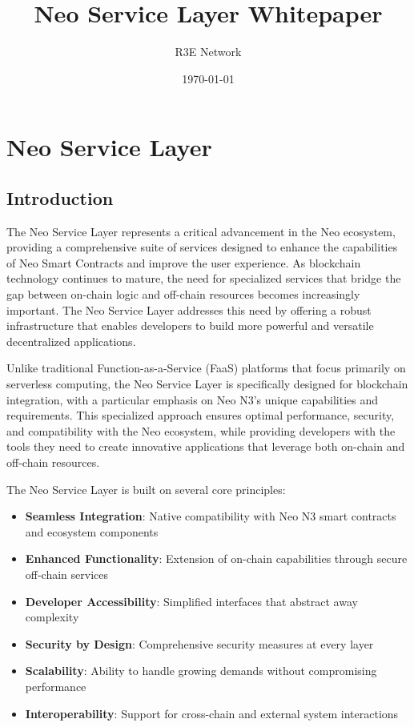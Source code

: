 \documentclass{article}
\title{Neo Service Layer Whitepaper}
\author{R3E Network}
\date{\today}
\begin{document}
\maketitle
\tableofcontents
\newpage

\section{Neo Service Layer}
\label{sec:neo-service-layer}

\subsection{Introduction}
\label{subsec:nsl-intro}

The Neo Service Layer represents a critical advancement in the Neo ecosystem, providing a comprehensive suite of services designed to enhance the capabilities of Neo Smart Contracts and improve the user experience. As blockchain technology continues to mature, the need for specialized services that bridge the gap between on-chain logic and off-chain resources becomes increasingly important. The Neo Service Layer addresses this need by offering a robust infrastructure that enables developers to build more powerful and versatile decentralized applications.

Unlike traditional Function-as-a-Service (FaaS) platforms that focus primarily on serverless computing, the Neo Service Layer is specifically designed for blockchain integration, with a particular emphasis on Neo N3's unique capabilities and requirements. This specialized approach ensures optimal performance, security, and compatibility with the Neo ecosystem, while providing developers with the tools they need to create innovative applications that leverage both on-chain and off-chain resources.

The Neo Service Layer is built on several core principles:

\begin{itemize}
    \item \textbf{Seamless Integration}: Native compatibility with Neo N3 smart contracts and ecosystem components
    \item \textbf{Enhanced Functionality}: Extension of on-chain capabilities through secure off-chain services
    \item \textbf{Developer Accessibility}: Simplified interfaces that abstract away complexity
    \item \textbf{Security by Design}: Comprehensive security measures at every layer
    \item \textbf{Scalability}: Ability to handle growing demands without compromising performance
    \item \textbf{Interoperability}: Support for cross-chain and external system interactions
\end{itemize}
\end{document}
